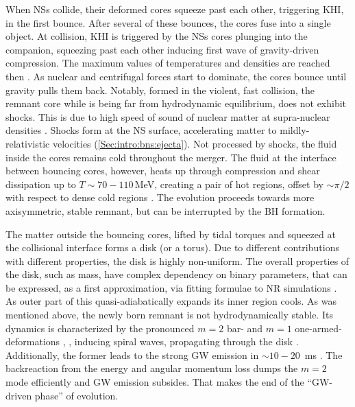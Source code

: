 When \acp{NS} collide, their deformed cores squeeze past each other, triggering \ac{KHI},
in the first bounce. After several of these bounces, the cores fuse into a single object.
At collision, \ac{KHI} is triggered by the \acp{NS} cores plunging into the companion,
squeezing past each other inducing first wave of gravity-driven compression. 
The maximum values of temperatures and densities are reached then \cite{70}. As 
nuclear and centrifugal forces start to dominate, the cores bounce until gravity 
pulls them back. 
Notably, formed in the violent, fast collision, the remnant core while is being far from 
hydrodynamic equilibrium, does not exhibit shocks. This is due to high speed of sound 
of nuclear matter at supra-nuclear densities 
.
Shocks form at the \ac{NS} surface, accelerating matter to mildly-relativistic velocities 
(\ref{Sec:intro:bns:ejecta}).
Not processed by shocks, the fluid inside the cores remains cold 
throughout the merger. The fluid at the interface between bouncing cores, however,
heats up through compression and shear dissipation 
up to $T\sim70-110\,$MeV, creating a pair of hot regions, offset by $\sim\pi/2$ with 
respect to dense cold regions \cite{71}.
%
The evolution proceeds towards more axisymmetric, stable remnant, but can be 
interrupted by the \ac{BH} formation. 

The matter outside the bouncing cores, lifted by tidal torques and squeezed at the 
collisional interface forms a disk (or a torus).
Due to different contributions with different properties, the disk is highly non-uniform.
The overall properties of the disk, such as mass, have complex dependency on 
binary parameters, that can be expressed, as a first approximation, via fitting 
formulae to \ac{NR} simulations \cite{62,72,63}. 
As outer part of this quasi-adiabatically expands 
its inner region cools. 
%
As was mentioned above, the newly born remnant is not hydrodynamically stable. 
Its dynamics is characterized by the pronounced $m=2$ bar- and $m=1$ one-armed-
deformations \cite{}, , inducing spiral waves, propagating through the 
disk . Additionally, the former leads to the strong \ac{GW} emission 
in $\sim10-20$~ms \pmerg{}. The backreaction from the energy and angular momentum 
loss dumps the $m=2$ mode efficiently and \ac{GW} emission subsides. 
That makes the end of the ``\ac{GW}-driven phase'' of \pmerg{} evolution. 

